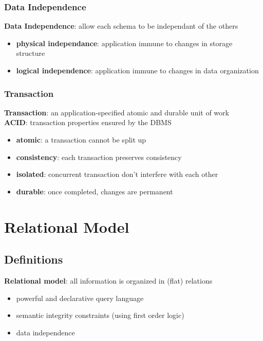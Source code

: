 \documentclass[]{article}
\theoremstyle{definition}
\begin{document}
			\subsubsection{Data Independence}
				\textbf{Data Independence}: allow each schema to be independant of the others
				\begin{itemize}
					\item \textbf{physical independance}: application immune to changes
	in storage structure
					\item \textbf{logical independence}: application immune to changes in data organization
				\end{itemize}
			\subsubsection{Transaction}
				\textbf{Transaction}: an application-specified atomic and durable unit of work \\
				\textbf{ACID}: transaction properties ensured by the DBMS
				\begin{itemize}
					\item \textbf{atomic}: a transaction cannot be split up 
					\item \textbf{consistency}: each transaction preserves consistency 
					\item \textbf{isolated}: concurrent transaction don't interfere with each other 
					\item \textbf{durable}: once completed, changes are permanent
				\end{itemize}

				
	\section{Relational Model}
		\subsection{Definitions}
			\textbf{Relational model}: all information is organized in (flat) relations
			\begin{itemize}
				\item powerful and declarative query language
				\item semantic integrity constraints (using first order logic)
				\item data independence
			\end{itemize}	
\end{document}
